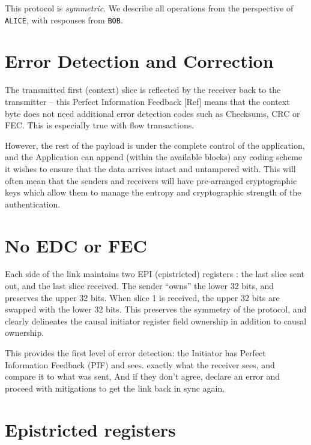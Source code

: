 \documentclass[../HFT-main.tex]{subfiles}
\begin{document}
This protocol is \emph{symmetric}. We describe all operations from the perspective of \texttt{ALICE}, with responses from \texttt{BOB}.


\section{Error Detection and Correction}

%

The transmitted first (context) slice is reflected by the receiver back to the transmitter -- this Perfect Information Feedback [Ref] means that the context byte does not need additional error detection codes such as Checksums, CRC or FEC. This is especially true with flow transactions. 

However, the rest of the payload is under the complete control of the application, and the Application can append (within the available blocks) any coding scheme it wishes to ensure that the data arrives intact and untampered with.  This will often mean that the senders and receivers will have pre-arranged cryptographic keys which allow them to manage the entropy and cryptographic strength of the authentication.

\section{No EDC or FEC}

Each side of the link maintains two EPI (epistricted) registers : the last slice sent out, and the last slice received. The sender “owns” the lower 32 bits, and preserves the upper 32 bits. When slice 1 is received, the upper 32 bits are swapped with the lower 32 bits.  This preserves the symmetry of the protocol, and clearly delineates the causal initiator register field ownership in addition to causal ownership.

This provides the first level of error detection: the Initiator has Perfect Information Feedback (PIF) and  sees. exactly what the receiver sees, and compare it to what was sent, And if they don’t agree, declare an error and proceed with mitigations to get the link back in sync again.

\section{Epistricted registers}
\end{document}
